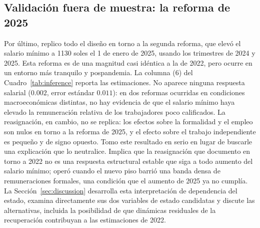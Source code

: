 \subsection{Validación fuera de muestra: la reforma de 2025}

Por último, replico todo el diseño en torno a la segunda reforma, que elevó el salario mínimo a 1130 soles el 1 de enero de 2025, usando los trimestres de 2024 y 2025. Esta reforma es de una magnitud casi idéntica a la de 2022, pero ocurre en un entorno más tranquilo y pospandemia. La columna (6) del Cuadro~\ref{tab:inference} reporta las estimaciones. No aparece ninguna respuesta salarial ($0.002$, error estándar $0.011$): en dos reformas ocurridas en condiciones macroeconómicas distintas, no hay evidencia de que el salario mínimo haya elevado la remuneración relativa de los trabajadores poco calificados. La reasignación, en cambio, no se replica: los efectos sobre la formalidad y el empleo son nulos en torno a la reforma de 2025, y el efecto sobre el trabajo independiente es pequeño y de signo opuesto. Tomo este resultado en serio en lugar de buscarle una explicación que lo neutralice. Implica que la reasignación que documento en torno a 2022 no es una respuesta estructural estable que siga a todo aumento del salario mínimo; operó cuando el nuevo piso barrió una banda densa de remuneraciones formales, una condición que el aumento de 2025 ya no cumplía. La Sección~\ref{sec:discussion} desarrolla esta interpretación de dependencia del estado, examina directamente sus dos variables de estado candidatas y discute las alternativas, incluida la posibilidad de que dinámicas residuales de la recuperación contribuyan a las estimaciones de 2022.
